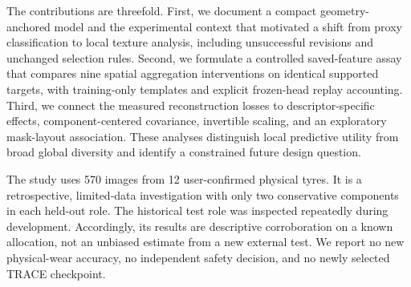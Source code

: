 The contributions are threefold. First, we document a compact geometry-anchored model and the experimental context that motivated a shift from proxy classification to local texture analysis, including unsuccessful revisions and unchanged selection rules. Second, we formulate a controlled saved-feature assay that compares nine spatial aggregation interventions on identical supported targets, with training-only templates and explicit frozen-head replay accounting. Third, we connect the measured reconstruction losses to descriptor-specific effects, component-centered covariance, invertible scaling, and an exploratory mask-layout association. These analyses distinguish local predictive utility from broad global diversity and identify a constrained future design question.

The study uses 570 images from 12 user-confirmed physical tyres. It is a retrospective, limited-data investigation with only two conservative components in each held-out role. The historical test role was inspected repeatedly during development. Accordingly, its results are descriptive corroboration on a known allocation, not an unbiased estimate from a new external test. We report no new physical-wear accuracy, no independent safety decision, and no newly selected TRACE checkpoint.
